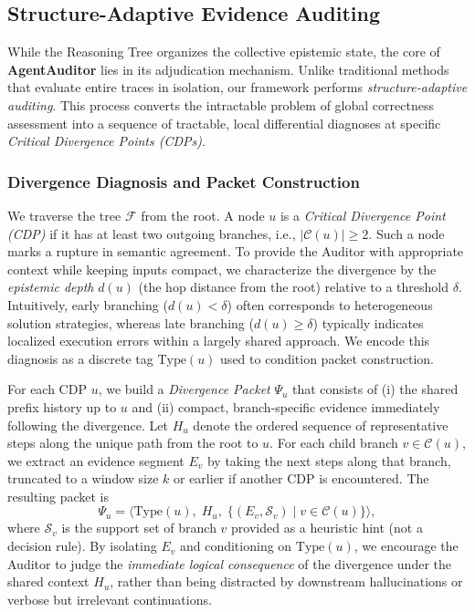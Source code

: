 \documentclass{article}
\theoremstyle{plain}
\theoremstyle{definition}
\theoremstyle{remark}
\begin{document}
\subsection{Structure-Adaptive Evidence Auditing}
\label{app:auditing}

While the Reasoning Tree organizes the collective epistemic state, the core of \textbf{AgentAuditor} lies in its adjudication mechanism. Unlike traditional methods that evaluate entire traces in isolation, our framework performs \textit{structure-adaptive auditing}. This process converts the intractable problem of global correctness assessment into a sequence of tractable, local differential diagnoses at specific \textit{Critical Divergence Points (CDPs)}.

\subsubsection{Divergence Diagnosis and Packet Construction}
\label{sec:packet_app}

We traverse the tree $\mathcal{F}$ from the root. A node $u$ is a \emph{Critical Divergence Point (CDP)} if it has at least two outgoing branches, i.e., $|\mathcal{C}(u)| \geq 2$. Such a node marks a rupture in semantic agreement. To provide the Auditor with appropriate context while keeping inputs compact, we characterize the divergence by the \emph{epistemic depth} $d(u)$ (the hop distance from the root) relative to a threshold $\delta$. Intuitively, early branching ($d(u) < \delta$) often corresponds to heterogeneous solution strategies, whereas late branching ($d(u)\geq \delta$) typically indicates localized execution errors within a largely shared approach. We encode this diagnosis as a discrete tag $\text{Type}(u)$ used to condition packet construction.

For each CDP $u$, we build a \emph{Divergence Packet} $\Psi_u$ that consists of (i) the shared prefix history up to $u$ and (ii) compact, branch-specific evidence immediately following the divergence. Let $H_u$ denote the ordered sequence of representative steps along the unique path from the root to $u$. For each child branch $v\in\mathcal{C}(u)$, we extract an evidence segment $E_v$ by taking the next steps along that branch, truncated to a window size $k$ or earlier if another CDP is encountered. The resulting packet is
\begin{equation}
    \Psi_u = \Big\langle \text{Type}(u),\; H_u,\; \{(E_v,\mathcal{S}_v)\mid v\in\mathcal{C}(u)\}\Big\rangle,
\end{equation}
where $\mathcal{S}_v$ is the support set of branch $v$ provided as a heuristic hint (not a decision rule). By isolating $E_v$ and conditioning on $\text{Type}(u)$, we encourage the Auditor to judge the \emph{immediate logical consequence} of the divergence under the shared context $H_u$, rather than being distracted by downstream hallucinations or verbose but irrelevant continuations.
\end{document}
